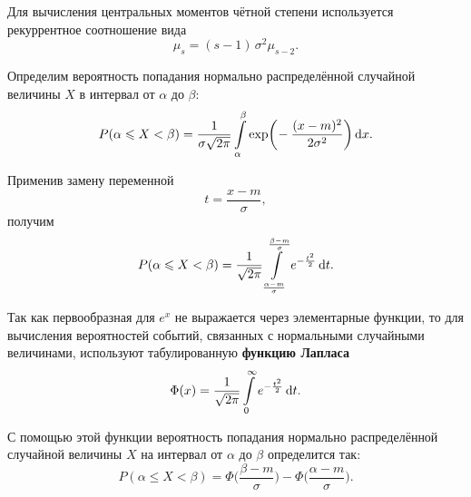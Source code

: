 \documentclass[a4paper]{article}
\DeclareMathOperator{\exp}{exp}
\newcommand{\sleq}{\leqslant}
\newcommand{\sqrtt}[1]{\sqrt{\vphantom{qb} #1}}
\newcommand{\key}[1]{{\color{Medium}\bfseries #1}}
\begin{document}
                    Для вычисления центральных моментов чётной степени используется рекуррентное соотношение вида
                    \begin{equation*}
                        \mu_s = (s - 1) \, \sigma^2 \mu_{s - 2} .
                    \end{equation*}

                    Определим вероятность попадания нормально распределённой случайной величины $X$ в интервал от $\alpha$ до $\beta$:
                    \begin{equation*}
                        P(\alpha \sleq X < \beta) = \frac{1}{\sigma \sqrtt{2 \pi}}
                            \int\limits_{\alpha}^{\beta} \exp \! \bigg( \!
                            -\frac{(x - m)^2}{2 \sigma^2} \bigg) \dif x .
                    \end{equation*}

                    Применив замену переменной
                    \begin{equation*}
                        t = \frac{x - m}{\sigma} ,
                    \end{equation*}
                    получим
                    \begin{equation*}
                        P(\alpha \sleq X < \beta) = \frac{1}{\sqrtt{2 \pi}}
                            \int\limits_{\frac{\alpha - m}{\sigma}}^{\frac{\beta - m}{\sigma}}
                            e^{-\frac{t^\text{\tiny 2}}{2}} \dif t .
                    \end{equation*}

                    Так как первообразная для $e^x$ не выражается через элементарные функции, то для вычисления вероятностей событий, связанных с нормальными случайными величинами, используют табулированную \key{функцию Лапласа}
                    \begin{equation*}
                        \Phi (x) = \frac{1}{\sqrtt{2 \pi}}
                            \int\limits_{0}^{\infty} e^{-\frac{t^\text{\tiny 2}}{2}} \dif t .
                    \end{equation*}

                    С помощью этой функции вероятность попадания нормально распределённой случайной величины $X$ на интервал от $\alpha$ до $\beta$ определится так:
                    \begin{equation*}
                        P(\alpha \sleq X < \beta) =
                            \Phi \Big( \frac{\beta - m}{\sigma} \Big) -
                            \Phi \Big( \frac{\alpha - m}{\sigma} \Big) .
                    \end{equation*}
\end{document}
